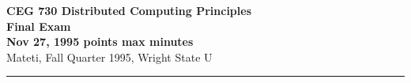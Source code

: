 \def\CSP{{\sc csp}}
\def\RPC{{\sc rpc}}
\def\SR{{\sc sr}}
\def\fat{\framebox[1mm]{\rule{0mm}{2mm}}}
\def\co{{\bf co}}
\def\oc{{\bf oc}}
\def\pa{{$\parallel$}}
\def\lb{$\langle$}
\def\rb{$\rangle$}
\def\ra{$\rightarrow$}
\def\await{{\bf await}}
\def\zand{\wedge}\def\zor{\vee}	\def\znot{\neg}

\parindent=0pt



{\bf CEG 
\large \bf 730 Distributed Computing Principles\\[5pt]
\large Final Exam\\[10pt]
Nov 27, 1995  points max  minutes\\
}
\bigskip
{Mateti,  Fall Quarter 1995, Wright State U}\\[-5pt]
\hrule

